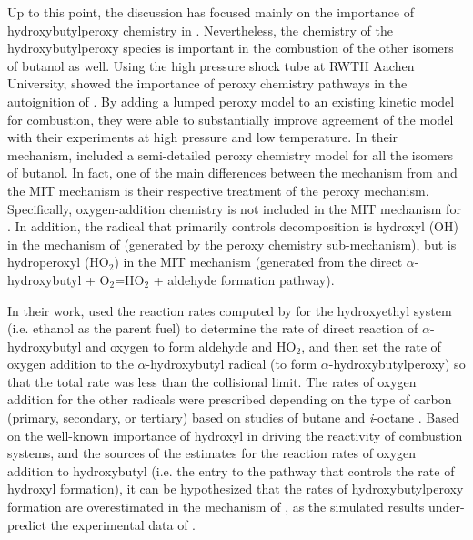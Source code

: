 \documentclass[12pt, letterpaper]{article}
\begin{document}
Up to this point, the discussion has focused mainly on the importance of
hydroxybutylperoxy chemistry in \tBuOH{}. Nevertheless, the chemistry
of the hydroxybutylperoxy species is important in the combustion of the other
isomers of butanol as well. Using the high pressure shock tube at RWTH Aachen
University, \textcite{Vranckx2011} showed the importance of peroxy chemistry
pathways in the autoignition of \nBuOH{}. By adding a lumped peroxy
model to an existing kinetic model for \nBuOH{} combustion, they were
able to substantially improve agreement of the model with their experiments at
high pressure and low temperature. In their mechanism, \textcite{Sarathy2012}
included a semi-detailed peroxy chemistry model for all the isomers of butanol.
In fact, one of the main differences between the mechanism from
\textcite{Sarathy2012} and the MIT mechanism \cite{Hansen2013,Merchant2013} is
their respective treatment of the peroxy mechanism. Specifically,
oxygen-addition chemistry is not included in the MIT mechanism for
\iBuOH{} \cite{Hansen2013,Merchant2013}. In addition, the radical
that primarily controls \iBuOH{} decomposition is hydroxyl (OH) in
the mechanism of \textcite{Sarathy2012} (generated by the peroxy chemistry
sub-mechanism), but is hydroperoxyl (HO$_2$) in the MIT mechanism
\cite{Hansen2013,Merchant2013} (generated from the direct $\alpha$-hydroxybutyl
+ O$_2$=HO$_2$ + aldehyde formation pathway).

In their work, \textcite{Sarathy2012} used the reaction rates computed by
\textcite{DaSilva2009} for the hydroxyethyl system (i.e. ethanol as the parent
fuel) to determine the rate of direct reaction of $\alpha$-hydroxybutyl and
oxygen to form aldehyde and HO$_2$, and then set the rate of oxygen addition to
the $\alpha$-hydroxybutyl radical (to form $\alpha$-hydroxybutylperoxy) so that
the total rate was less than the collisional limit. The rates of oxygen
addition for the other radicals were prescribed depending on the type of carbon
(primary, secondary, or tertiary) based on studies of butane and
\textit{i}-octane \cite{Sarathy2012}. Based on the well-known importance of
hydroxyl in driving the reactivity of combustion systems, and the sources of
the estimates for the reaction rates of oxygen addition to hydroxybutyl (i.e.
the entry to the pathway that controls the rate of hydroxyl formation), it can
be hypothesized that the rates of hydroxybutylperoxy formation are
overestimated in the mechanism of \textcite{Sarathy2012}, as the simulated
results under-predict the experimental data of \iBuOH{}.
\end{document}
